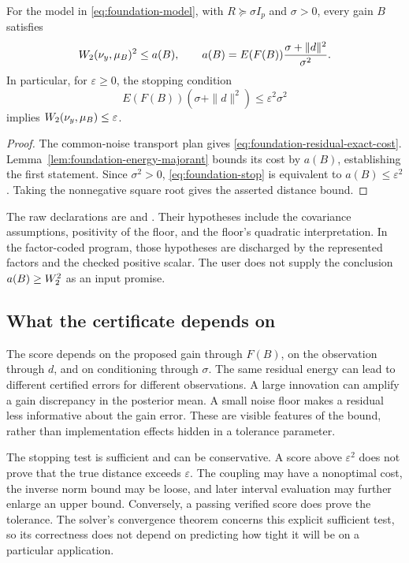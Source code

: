 \begin{theorem}
\label{thm:foundation-residual-certificate}
For the model in \eqref{eq:foundation-model}, with $R\succeq\sigma I_p$ and $\sigma>0$, every gain $B$ satisfies
\begin{equation}
 W_2(\nu_y,\mu_B)^2\le a(B),\qquad
 a(B)=E(F(B))\frac{\sigma+\|d\|^2}{\sigma^2}.
 \label{eq:foundation-score}
\end{equation}
In particular, for $\varepsilon\ge0$, the stopping condition
\begin{equation}
 E(F(B))(\sigma+\|d\|^2)\le\varepsilon^2\sigma^2
 \label{eq:foundation-stop}
\end{equation}
implies $W_2(\nu_y,\mu_B)\le\varepsilon$.
\end{theorem}
\begin{proof}
The common-noise transport plan gives \eqref{eq:foundation-residual-exact-cost}. Lemma~\ref{lem:foundation-energy-majorant} bounds its cost by $a(B)$, establishing the first statement. Since $\sigma^2>0$, \eqref{eq:foundation-stop} is equivalent to $a(B)\le\varepsilon^2$. Taking the nonnegative square root gives the asserted distance bound.
\end{proof}

The raw declarations are  and . Their hypotheses include the covariance assumptions, positivity of the floor, and the floor's quadratic interpretation. In the factor-coded program, those hypotheses are discharged by the represented factors and the checked positive scalar. The user does not supply the conclusion $a(B)\ge W_2^2$ as an input promise.

\subsection{What the certificate depends on}

The score depends on the proposed gain through $F(B)$, on the observation through $d$, and on conditioning through $\sigma$. The same residual energy can lead to different certified errors for different observations. A large innovation can amplify a gain discrepancy in the posterior mean. A small noise floor makes a residual less informative about the gain error. These are visible features of the bound, rather than implementation effects hidden in a tolerance parameter.

The stopping test is sufficient and can be conservative. A score above $\varepsilon^2$ does not prove that the true distance exceeds $\varepsilon$. The coupling may have a nonoptimal cost, the inverse norm bound may be loose, and later interval evaluation may further enlarge an upper bound. Conversely, a passing verified score does prove the tolerance. The solver's convergence theorem concerns this explicit sufficient test, so its correctness does not depend on predicting how tight it will be on a particular application.

